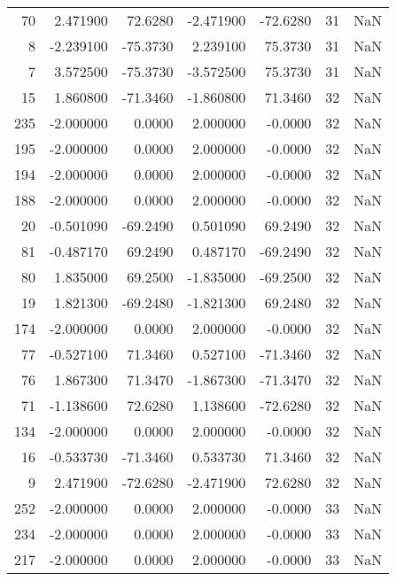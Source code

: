 \begin{tabular}{rrrrrrr}
 70 &   2.471900 &   72.6280 &  -2.471900 &    -72.6280 &          31 & NaN \\
  8 &  -2.239100 &  -75.3730 &   2.239100 &     75.3730 &          31 & NaN \\
  7 &   3.572500 &  -75.3730 &  -3.572500 &     75.3730 &          31 & NaN \\
 15 &   1.860800 &  -71.3460 &  -1.860800 &     71.3460 &          32 & NaN \\
235 &  -2.000000 &    0.0000 &   2.000000 &     -0.0000 &          32 & NaN \\
195 &  -2.000000 &    0.0000 &   2.000000 &     -0.0000 &          32 & NaN \\
194 &  -2.000000 &    0.0000 &   2.000000 &     -0.0000 &          32 & NaN \\
188 &  -2.000000 &    0.0000 &   2.000000 &     -0.0000 &          32 & NaN \\
 20 &  -0.501090 &  -69.2490 &   0.501090 &     69.2490 &          32 & NaN \\
 81 &  -0.487170 &   69.2490 &   0.487170 &    -69.2490 &          32 & NaN \\
 80 &   1.835000 &   69.2500 &  -1.835000 &    -69.2500 &          32 & NaN \\
 19 &   1.821300 &  -69.2480 &  -1.821300 &     69.2480 &          32 & NaN \\
174 &  -2.000000 &    0.0000 &   2.000000 &     -0.0000 &          32 & NaN \\
 77 &  -0.527100 &   71.3460 &   0.527100 &    -71.3460 &          32 & NaN \\
 76 &   1.867300 &   71.3470 &  -1.867300 &    -71.3470 &          32 & NaN \\
 71 &  -1.138600 &   72.6280 &   1.138600 &    -72.6280 &          32 & NaN \\
134 &  -2.000000 &    0.0000 &   2.000000 &     -0.0000 &          32 & NaN \\
 16 &  -0.533730 &  -71.3460 &   0.533730 &     71.3460 &          32 & NaN \\
  9 &   2.471900 &  -72.6280 &  -2.471900 &     72.6280 &          32 & NaN \\
252 &  -2.000000 &    0.0000 &   2.000000 &     -0.0000 &          33 & NaN \\
234 &  -2.000000 &    0.0000 &   2.000000 &     -0.0000 &          33 & NaN \\
217 &  -2.000000 &    0.0000 &   2.000000 &     -0.0000 &          33 & NaN \\

\end{tabular}
